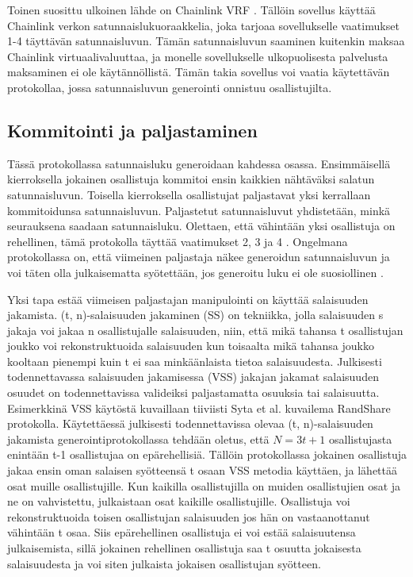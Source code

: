 \documentclass{article}
\begin{document}
Toinen suosittu ulkoinen lähde on Chainlink VRF \cite{noauthor_verifiable_2020}. Tällöin sovellus käyttää Chainlink verkon satunnaislukuoraakkelia, joka tarjoaa sovellukselle vaatimukset 1-4 täyttävän satunnaisluvun. Tämän satunnaisluvun saaminen kuitenkin maksaa Chainlink virtuaalivaluuttaa, ja monelle sovellukselle ulkopuolisesta palvelusta maksaminen ei ole käytännöllistä. Tämän takia sovellus voi vaatia käytettävän protokollaa, jossa satunnaisluvun generointi onnistuu osallistujilta.

\subsection{Kommitointi ja paljastaminen}
Tässä protokollassa satunnaisluku generoidaan kahdessa osassa. Ensimmäisellä kierroksella jokainen osallistuja kommitoi ensin kaikkien nähtäväksi salatun satunnaisluvun. Toisella kierroksella osallistujat paljastavat yksi kerrallaan kommitoidunsa satunnaisluvun. Paljastetut satunnaisluvut yhdistetään, minkä seurauksena saadaan satunnaisluku. Olettaen, että vähintään yksi osallistuja on rehellinen, tämä protokolla täyttää vaatimukset 2, 3 ja 4 \cite{simic_review_2020}. Ongelmana protokollassa on, että viimeinen paljastaja näkee generoidun satunnaisluvun ja voi täten olla julkaisematta syötettään, jos generoitu luku ei ole suosiollinen \cite{simic_review_2020}.

Yksi tapa estää viimeisen paljastajan manipulointi on käyttää salaisuuden jakamista. (t, n)-salaisuuden jakaminen (SS) on tekniikka, jolla salaisuuden s jakaja voi jakaa n osallistujalle salaisuuden, niin, että mikä tahansa t osallistujan joukko voi rekonstruktuoida salaisuuden kun toisaalta mikä tahansa joukko kooltaan pienempi kuin t ei saa minkäänlaista tietoa salaisuudesta\cite{syta_scalable_2017}. Julkisesti todennettavassa salaisuuden jakamisessa (VSS) jakajan jakamat salaisuuden osuudet on todennettavissa valideiksi paljastamatta osuuksia tai salaisuutta. Esimerkkinä VSS käytöstä kuvaillaan tiiviisti Syta et al.\cite{syta_scalable_2017} kuvailema RandShare protokolla. Käytettäessä julkisesti todennettavissa olevaa (t, n)-salaisuuden jakamista generointiprotokollassa tehdään oletus, että $N = 3t+1$ osallistujasta enintään t-1 osallistujaa on epärehellisiä. Tällöin protokollassa jokainen osallistuja jakaa ensin oman salaisen syötteensä t osaan VSS metodia käyttäen, ja lähettää osat muille osallistujille. Kun kaikilla osallistujilla on muiden osallistujien osat ja ne on vahvistettu, julkaistaan osat kaikille osallistujille. Osallistuja voi rekonstruktuoida toisen osallistujan salaisuuden jos hän on vastaanottanut vähintään t osaa. Siis epärehellinen osallistuja ei voi estää salaisuutensa julkaisemista, sillä jokainen rehellinen osallistuja saa t osuutta jokaisesta salaisuudesta ja voi siten julkaista jokaisen osallistujan syötteen. 
\end{document}
